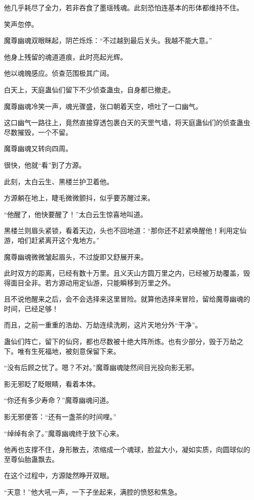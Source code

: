 \begin{this_body}
他几乎耗尽了全力，若非吞食了墨瑶残魂。此刻恐怕连基本的形体都维持不住。

笑声忽停。

魔尊幽魂双眼眯起，阴芒烁烁：“不过越到最后关头。我越不能大意。”

他身上残留的魂道道痕，此时亮起光辉。

他以魂魄感应。侦查范围极其广阔。

白天上，天庭蛊仙们留下不少侦查蛊虫，自身都已撤走。

魔尊幽魂冷笑一声，魂光骤盛，张口朝着天空，喷吐了一口幽气。

这口幽气一路往上，竟然直接穿透包裹白天的天罡气墙，将天庭蛊仙们的侦查蛊虫尽数摧毁，一个不留。

魔尊幽魂又转向四周。

很快，他就“看”到了方源。

此刻，太白云生、黑楼兰护卫着他。

方源躺在地上，睫毛微微颤抖，似乎要苏醒过来。

“他醒了，他快要醒了！”太白云生惊喜地叫道。

黑楼兰则眉头紧锁，看着天边，头也不回地道：“那你还不赶紧唤醒他！利用定仙游，咱们赶紧离开这个鬼地方。”

魔尊幽魂微微皱起眉头，不过旋即又舒展开来。

此时双方的距离，已经有数十万里。且义天山方圆万里之内，已经被万劫覆盖，毁得面目全非。若方源动用定仙游，只能瞬移到万里之外。

且不说他醒来之后，会不会选择来这里冒险。就算他选择来冒险，留给魔尊幽魂的时间，已经足够！

而且，之前一重重的浩劫、万劫连续洗刷，这片天地分外“干净”。

蛊仙们阵亡，留下的仙窍，都也尽数被十绝大阵所炼。也有少部分，毁于万劫之下。唯有生死福地，被刻意保留下来。

“没有后顾之忧了。嗯？不对。”魔尊幽魂陡然间目光投向影无邪。

影无邪眨了眨眼睛，看着本体。

“你还有多少寿命？”魔尊幽魂问道。

影无邪便答：“还有一盏茶的时间哩。”

“绰绰有余了。”魔尊幽魂终于放下心来。

他再也支撑不住，身形散去，浓缩成一个魂球，脸盆大小，凝如实质，向圆球似的至尊仙胎蛊飘去。

在这个过程中，方源陡然睁开双眼。

“天意！”他大吼一声，一下子坐起来，满腔的愤怒和焦急。


\end{this_body}
